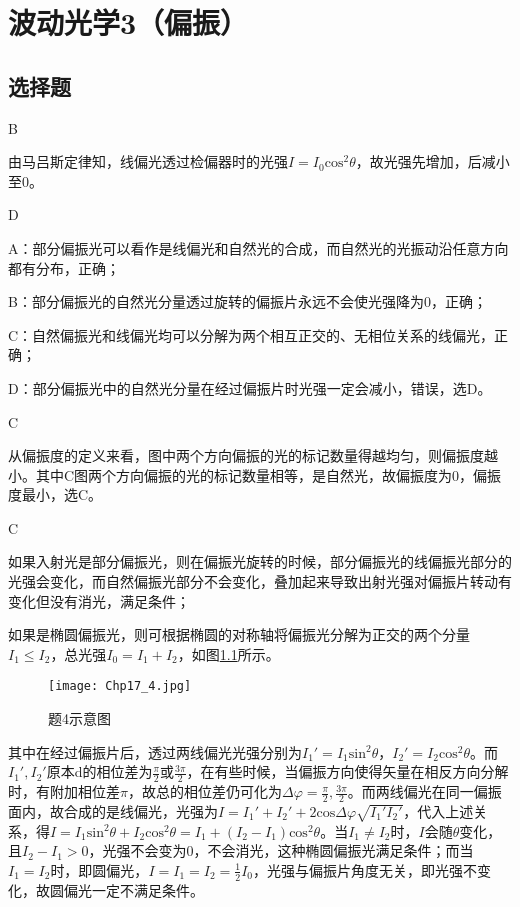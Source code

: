 \chapter{波动光学3（偏振）}
\section{选择题}
\exercise B

\solve 由马吕斯定律知，线偏光透过检偏器时的光强$I=I_0\mathrm{cos}^2\theta$，故光强先增加，后减小至0。

\exercise D

\solve A：部分偏振光可以看作是线偏光和自然光的合成，而自然光的光振动沿任意方向都有分布，正确；

B：部分偏振光的自然光分量透过旋转的偏振片永远不会使光强降为0，正确；

C：自然偏振光和线偏光均可以分解为两个相互正交的、无相位关系的线偏光，正确；

D：部分偏振光中的自然光分量在经过偏振片时光强一定会减小，错误，选D。

\exercise C

\solve 从偏振度的定义来看，图中两个方向偏振的光的标记数量得越均匀，则偏振度越小。其中C图两个方向偏振的光的标记数量相等，是自然光，故偏振度为0，偏振度最小，选C。

\exercise C

\solve 如果入射光是部分偏振光，则在偏振光旋转的时候，部分偏振光的线偏振光部分的光强会变化，而自然偏振光部分不会变化，叠加起来导致出射光强对偏振片转动有变化但没有消光，满足条件；

如果是椭圆偏振光，则可根据椭圆的对称轴将偏振光分解为正交的两个分量$I_1\leqslant I_2$，总光强$I_0=I_1+I_2$，如图\ref{4}所示。

\begin{figure}[htbp]
	\centering
	\texttt{[image: Chp17\_4.jpg]}
	\caption{题4示意图}
	\label{4}
\end{figure}

其中在经过偏振片后，透过两线偏光光强分别为$I_1'=I_1\mathrm{sin}^2\theta$，$I_2'=I_2\mathrm{cos}^2\theta$。而$I_1',I_2'$原本d的相位差为$\frac{\pi}{2}$或$\frac{3\pi}{2}$，在有些时候，当偏振方向使得矢量在相反方向分解时，有附加相位差$\pi$，故总的相位差仍可化为$\Delta \varphi=\frac{\pi}{2},\frac{3\pi}{2}$。而两线偏光在同一偏振面内，故合成的是线偏光，光强为$I=I_1'+I_2'+2\mathrm{cos}\Delta \varphi\sqrt{I_1'I_2'}$，代入上述关系，得$I=I_1\mathrm{sin}^2\theta+I_2\mathrm{cos}^2\theta=I_1+(I_2-I_1)\mathrm{cos}^2\theta$。当$I_1\not= I_2$时，$I$会随$\theta$变化，且$I_2-I_1>0$，光强不会变为0，不会消光，这种椭圆偏振光满足条件；而当$I_1=I_2$时，即圆偏光，$I=I_1=I_2=\frac{1}{2}I_0$，光强与偏振片角度无关，即光强不变化，故圆偏光一定不满足条件。

